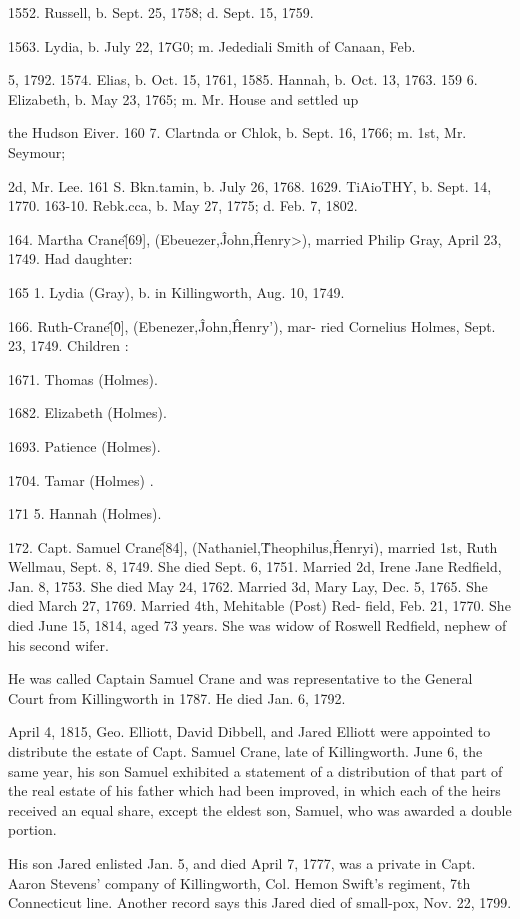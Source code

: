 1552. Russell, b. Sept. 25, 1758; d. Sept. 15, 1759. 




1563. Lydia, b. July 22, 17G0; m. Jedediali Smith of Canaan, Feb. 

5, 1792. 
1574. Elias, b. Oct. 15, 1761, 
1585. Hannah, b. Oct. 13, 1763. 
159  6. Elizabeth, b. May 23, 1765; m. Mr. House and settled up 

the Hudson Eiver. 
160  7. Clartnda or Chlok, b. Sept. 16, 1766; m. 1st, Mr. Seymour; 

2d, Mr. Lee. 
161 S. Bkn.tamin, b. July 26, 1768. 
1629. TiAioTHY, b. Sept. 14, 1770. 
163-10. Rebk.cca, b. May 27, 1775; d. Feb. 7, 1802. 

164. Martha Crane\^ [69], (Ebeuezer,\^ John,\^ Henry>), 
married Philip Gray, April 23, 1749. Had daughter: 

165  1. Lydia (Gray), b. in Killingworth, Aug. 10, 1749. 

166. Ruth-Crane\^ [\^0], (Ebenezer,\^ John,\^ Henry'), mar- 
ried Cornelius Holmes, Sept. 23, 1749. Children : 

1671. Thomas (Holmes). 

1682. Elizabeth (Holmes). 

1693. Patience (Holmes). 

1704. Tamar (Holmes) . 

171  5. Hannah (Holmes). 

172. Capt. Samuel Crane\^ [84], (Nathaniel,\^ Theophilus,\^ 
Henryi), married 1st, Ruth Wellmau, Sept. 8, 1749. She died 
Sept. 6, 1751. Married 2d, Irene Jane Redfield, Jan. 8, 1753. 
She died May 24, 1762. Married 3d, Mary Lay, Dec. 5, 1765. 
She died March 27, 1769. Married 4th, Mehitable (Post) Red- 
field, Feb. 21, 1770. She died June 15, 1814, aged 73 years. 
She was widow of Roswell Redfield, nephew of his second wifer. 

He was called Captain Samuel Crane and was representative 
to the General Court from Killingworth in 1787. He died Jan. 
6, 1792. 

April 4, 1815, Geo. Elliott, David Dibbell, and Jared Elliott 
were appointed to distribute the estate of Capt. Samuel Crane, 
late of Killingworth. June 6, the same year, his son Samuel 
exhibited a statement of a distribution of that part of the real 
estate of his father which had been improved, in which each of 
the heirs received an equal share, except the eldest son, Samuel, 
who was awarded a double portion. 

His son Jared enlisted Jan. 5, and died April 7, 1777, was a 
private in Capt. Aaron Stevens' company of Killingworth, Col. 
Hemon Swift's regiment, 7th Connecticut line. Another record 
says this Jared died of small-pox, Nov. 22, 1799. 

